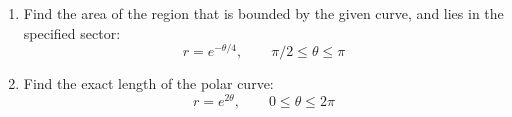 \begin{enumerate}
\begin{enumerate}
\end{enumerate}


\vfill

\item Find the area of the region that is bounded by the given curve, and lies in the specified sector:
\[
r=e^{-\theta/4}, \qquad \pi/2\leq \theta \leq \pi
\]

\vfill

\item Find the exact length of the polar curve:
\[
r=e^{2\theta}, \qquad 0\leq \theta \leq 2\pi
\]

\vfill



\end{enumerate}


